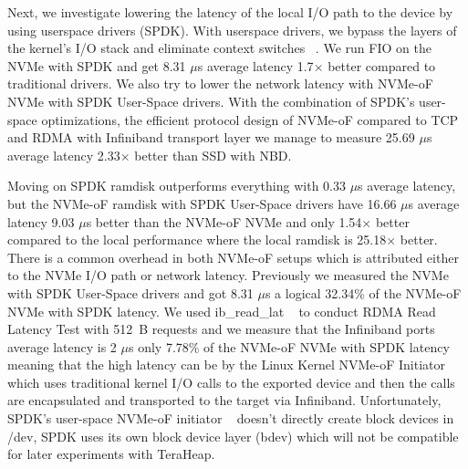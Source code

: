 Next, we investigate lowering the latency of the local I/O path to the device by using userspace drivers (SPDK). With userspace drivers, we bypass the layers of the kernel's I/O stack and eliminate context switches ~\cite{spdk}. We run FIO on the NVMe with SPDK and get 8.31 $\mu$s average latency 1.7$\times$ better compared to traditional drivers. We also try to lower
the network latency with NVMe-oF NVMe with SPDK User-Space drivers. With the combination of SPDK’s user-space optimizations, the efficient protocol design of NVMe-oF compared to TCP and RDMA with Infiniband transport layer we manage to measure 25.69 $\mu$s average latency 2.33$\times$ better than SSD with NBD. 

Moving on SPDK ramdisk outperforms everything with 0.33 $\mu$s average latency,
but the NVMe-oF ramdisk with SPDK User-Space drivers have 16.66 $\mu$s average
latency 9.03 $\mu$s better than the NVMe-oF NVMe and only 1.54$\times$ better
compared to the local performance where the local ramdisk is 25.18$\times$
better. There is a common overhead in both NVMe-oF setups which is attributed
either to the NVMe I/O path or network latency. Previously we measured the NVMe
with SPDK User-Space drivers and got 8.31 $\mu$s a logical 32.34\% of the
NVMe-oF NVMe with SPDK latency. We used ib\_read\_lat ~\cite{perftest} to
conduct RDMA Read Latency Test with \SI{512}{B} requests and we measure that the
Infiniband ports average latency is 2 $\mu$s only 7.78\% of the NVMe-oF NVMe
with SPDK latency meaning that the high latency can be by the Linux Kernel
NVMe-oF Initiator which uses traditional kernel I/O calls to the exported device
and then the calls are encapsulated and transported to the target via
Infiniband. Unfortunately, SPDK's user-space NVMe-oF initiator ~\cite{spdk}
doesn't directly create block devices in /dev, SPDK uses its own block
device layer (bdev) which will not be compatible for later experiments with TeraHeap. 


